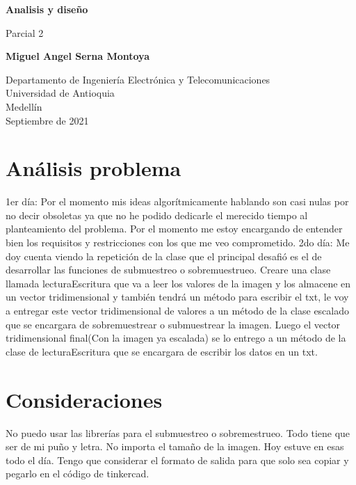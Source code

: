 \documentclass{article}
\begin{document}
\begin{titlepage}
    \begin{center}
        \vspace*{1cm}
            
        \Huge
        \textbf{Analisis y diseño}
            
        \vspace{0.5cm}
        \LARGE
        Parcial 2
            
        \vspace{1.5cm}
        \textbf{Miguel Angel Serna Montoya}
            
        \vfill
            
        \vspace{0.8cm}
            
        \Large
        Departamento de Ingeniería Electrónica y Telecomunicaciones\\
        Universidad de Antioquia\\
        Medellín\\
        Septiembre de 2021
            
    \end{center}
\end{titlepage}

\tableofcontents

\section{Análisis problema} \label{contenido}
1er día: Por el momento mis ideas algorítmicamente hablando son casi nulas por no decir obsoletas ya que no he podido dedicarle el merecido tiempo al planteamiento del problema. Por el momento me estoy encargando de entender bien los requisitos y restricciones con los que me veo comprometido.
2do día: Me doy cuenta viendo la repetición de la clase que el principal desafió es el de desarrollar las funciones de submuestreo o sobremuestrueo. Creare una clase llamada lecturaEscritura que va a leer los valores de la imagen y los almacene en un vector tridimensional y también tendrá un método para escribir el txt, le voy a entregar este vector tridimensional de valores a un método de la clase escalado que se encargara de sobremuestrear o submuestrear la imagen. Luego el vector tridimensional final(Con la imagen ya escalada) se lo entrego a un método de  la clase de lecturaEscritura que se encargara de escribir los datos en un txt.
\section{Consideraciones}
No puedo usar las librerías para el submuestreo o sobremestrueo. Todo tiene que ser de mi puño y letra.
No importa el tamaño de la imagen. Hoy estuve en esas todo el día.
Tengo que considerar el formato de salida para que solo sea copiar y pegarlo en el código de tinkercad.
\newpage
\end{document}
